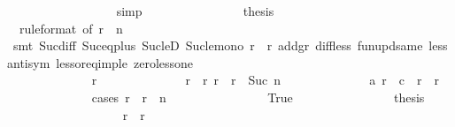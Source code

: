 \begin{isabellebody}
\ \ \ \ \ \ \ \ \ \ \ \ \ \ \ \ \isamarkupfalse%
\ simp\isanewline
\ \ \ \ \ \ \ \ \ \ \ \ \ \ \isamarkupfalse%
\ {\isacharquery}thesis\isanewline
\ \ \ \ \ \ \ \ \ \ \ \ \ \ \ \ \isamarkupfalse%
\ {\isacharasterisk}{\isacharparenleft}{}{\isacharparenright}\ {\isacharasterisk}{\isacharparenleft}{}{\isacharparenright}{\isacharbrackleft}rule{\isacharunderscore}format{\isacharcomma}\ of\ {\isachardoublequoteopen}r{}\ {\isacharplus}\ n\ {\isacharminus}\ {}{\isachardoublequoteclose}{\isacharbrackright}\isanewline
\ \ \ \ \ \ \ \ \ \ \ \ \ \ \ \ \isamarkupfalse%
\ {\isacharparenleft}smt\ Suc{\isacharunderscore}diff{\isacharunderscore}{}\ Suc{\isacharunderscore}eq{\isacharunderscore}plus{}\ Suc{\isacharunderscore}leD\ Suc{\isacharunderscore}le{\isacharunderscore}mono\ {\isacartoucheopen}r{}\ {\isacharless}\ r{\isacartoucheclose}\ add{\isacharunderscore}gr{\isacharunderscore}{}\ diff{\isacharunderscore}less\ fun{\isacharunderscore}upd{\isacharunderscore}same\ less{\isacharunderscore}antisym\ less{\isacharunderscore}or{\isacharunderscore}eq{\isacharunderscore}imp{\isacharunderscore}le\ zero{\isacharunderscore}less{\isacharunderscore}one{\isacharparenright}\isanewline
\ \ \ \ \ \ \ \ \ \ \ \ \isamarkupfalse%
\isanewline
\ \ \ \ \ \ \ \ \ \ \isamarkupfalse%
\ \ \ \ \ \ \ \ \ \ \ \ \ \ \ \ \isanewline
\ \ \ \ \ \ \ \ \ \ \ \ \isamarkupfalse%
\ r\isanewline
\ \ \ \ \ \ \ \ \ \ \ \ \isamarkupfalse%
\ {\isachardoublequoteopen}r{}\ {\isacharless}\ r{\isachardoublequoteclose}\ {\isachardoublequoteopen}r\ {\isacharless}\ r{}\ {\isacharplus}\ Suc\ n{\isachardoublequoteclose}\isanewline
\ \ \ \ \ \ \ \ \ \ \ \ \isamarkupfalse%
\ {\isachardoublequoteopen}{\isacharquery}a\ r\ {\isasymle}\ c{}\ {\isacharplus}\ {\isacharparenleft}r\ {\isacharminus}\ r{}{\isacharparenright}{\isachardoublequoteclose}\isanewline
\ \ \ \ \ \ \ \ \ \ \ \ \isamarkupfalse%
\ {\isacharparenleft}cases\ {\isachardoublequoteopen}r\ {\isacharless}\ r{}\ {\isacharplus}\ n{\isachardoublequoteclose}{\isacharparenright}\isanewline
\ \ \ \ \ \ \ \ \ \ \ \ \ \ \isamarkupfalse%
\ True\isanewline
\ \ \ \ \ \ \ \ \ \ \ \ \ \ \isamarkupfalse%
\ {\isacharquery}thesis\isanewline
\ \ \ \ \ \ \ \ \ \ \ \ \ \ \ \ \isamarkupfalse%
\ {\isacharasterisk}\ {\isacharbackquoteopen}r{}\ {\isacharless}\ r{\isacharbackquoteclose}\isanewline

\end{isabellebody}
